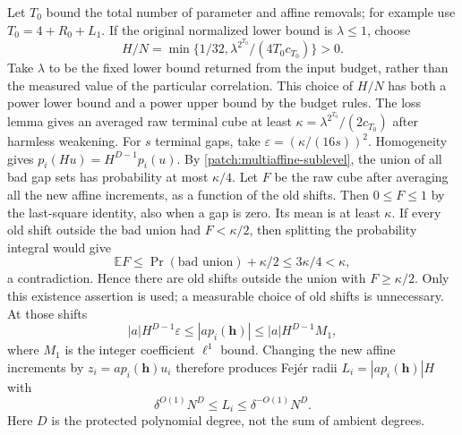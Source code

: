 \documentclass[11pt]{article}
\theoremstyle{definition}
\begin{document}
Let $T_0$ bound the total number of parameter and affine removals; for example use
$T_0=4+R_0+L_1$.  If the original normalized lower bound is $\lambda\leq1$, choose
\[
 H/N=\min\{1/32,\lambda^{2^{T_0}}/(4T_0c_{T_0})\}>0.
\]
Take $\lambda$ to be the fixed lower bound returned from the input budget, rather than
the measured value of the particular correlation.  This choice of $H/N$ has both a power
lower bound and a power upper bound by the budget rules.  The loss lemma gives an averaged raw
terminal cube at least $\kappa=\lambda^{2^{T_0}}/(2c_{T_0})$ after harmless weakening.
For $s$ terminal gaps, take $\varepsilon=(\kappa/(16s))^2$.
Homogeneity gives $p_i(Hu)=H^{D-1}p_i(u)$.
By \cref{patch:multiaffine-sublevel}, the union of all bad gap sets has probability at most
$\kappa/4$.  Let $F$ be the raw cube after averaging all the new affine increments, as a function
of the old shifts. Then $0\leq F\leq1$ by the last-square identity, also when a gap is zero.
Its mean is at least $\kappa$. If every old shift outside the bad union had
$F<\kappa/2$, then splitting the probability integral would give
\[
 \mathbb E F\leq\Pr(\text{bad union})+\kappa/2\leq3\kappa/4<\kappa,
\]
a contradiction. Hence there are old shifts outside the union with $F\geq\kappa/2$.
Only this existence assertion is used; a measurable choice of old shifts is unnecessary.  At those shifts
\[
 |a|H^{D-1}\varepsilon\leq |a p_i(\mathbf h)|
       \leq |a|H^{D-1}M_1,
\]
where $M_1$ is the integer coefficient $\ell^1$ bound.
Changing the new affine increments by $z_i=a p_i(\mathbf h)u_i$ therefore produces
Fej\'er radii $L_i=|a p_i(\mathbf h)|H$ with
\[
 \label{patch:pet-physical-radii}
 \delta^{O(1)}N^D\leq L_i\leq\delta^{-O(1)}N^D.
 \tag{\theequation}
\]
Here $D$ is the protected polynomial degree, not the sum of ambient degrees.
\end{document}
